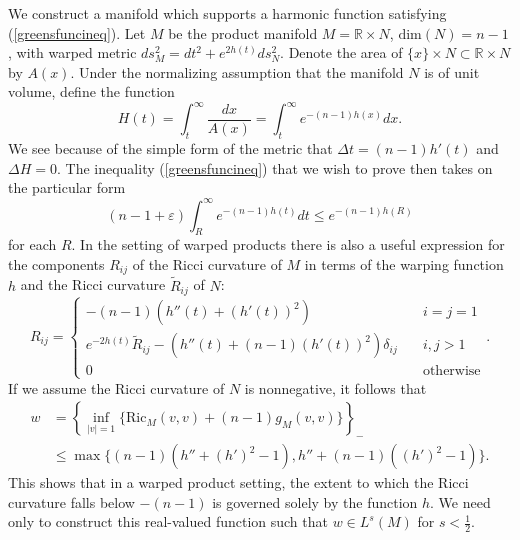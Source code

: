 \documentclass{amsart}
\theoremstyle{definition}
\theoremstyle{remark}
\numberwithin{equation}{section}
\begin{document}
We construct a manifold which supports a harmonic function satisfying (\ref{greensfuncineq}). Let $M$ be the product manifold $M=\mathbb{R}\times N$, $\text{dim}(N) = n-1$, with warped metric $ds_M^2=dt^2+e^{2h(t)}ds_N^2$. Denote the area of $\{x\}\times N\subset \mathbb{R}\times N$ by $A(x)$. Under the normalizing assumption that the manifold $N$ is of unit volume, define the function
\begin{equation*}
H(t)=\int_{t}^\infty \frac{dx}{A(x)}=\int_t^\infty e^{-(n-1)h(x)}dx.
\end{equation*}
We see because of the simple form of the metric that $\Delta t= (n-1)h'(t)$ and $\Delta H=0$. The inequality (\ref{greensfuncineq}) that we wish to prove then takes on the particular form
\begin{equation}\label{warpedproductineq}
    (n-1+\varepsilon)\int_{R}^\infty e^{-(n-1)h(t)}dt\leq e^{-(n-1)h(R)}
\end{equation}
for each $R$. In the setting of warped products there is also a useful expression for the components $R_{ij}$ of the Ricci curvature of $M$ in terms of the warping function $h$ and the Ricci curvature $\widetilde{R}_{ij}$ of $N$:
\[
R_{ij}=
\begin{cases}
    -(n-1)(h''(t)+(h'(t))^2)&\quad i=j=1\\
    e^{-2h(t)}\widetilde{R}_{ij}-(h''(t)+(n-1)(h'(t))^2)\delta_{ij}&\quad i,j>1\\
    0&\quad \text{otherwise}
\end{cases}.
\]
If we assume the Ricci curvature of $N$ is nonnegative, it follows that 
\begin{align*}
w&=\left\{\inf_{|v|=1}\{\text{Ric}_M(v,v)+(n-1)g_M(v,v)\}\right\}_{-}\\
&\leq \max\{(n-1)(h''+(h')^2-1), h''+(n-1)((h')^2-1)\}.
\end{align*}
This shows that in a warped product setting, the extent to which the Ricci curvature falls below $-(n-1)$ is governed solely by the function $h$. We need only to construct this real-valued function such that $w\in L^s(M)$ for $s<\frac{1}{2}$. 
\end{document}
